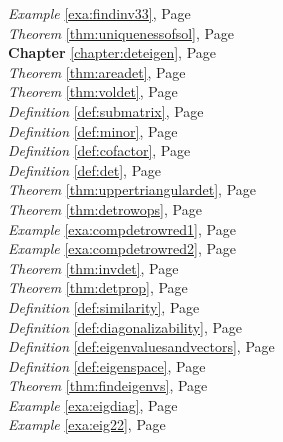 \begin{multicols}{3}
\begin{center}
      \textit{Example} \ref{exa:findinv33}, Page \pageref{exa:findinv33} \\
      \textit{Theorem} \ref{thm:uniquenessofsol}, Page \pageref{thm:uniquenessofsol} \\
      \textbf{Chapter} \ref{chapter:deteigen}, Page \pageref{chapter:deteigen} \\
      \textit{Theorem} \ref{thm:areadet}, Page \pageref{thm:areadet} \\
      \textit{Theorem} \ref{thm:voldet}, Page \pageref{thm:voldet} \\
      \textit{Definition} \ref{def:submatrix}, Page \pageref{def:submatrix} \\
      \textit{Definition} \ref{def:minor}, Page \pageref{def:minor} \\
      \textit{Definition} \ref{def:cofactor}, Page \pageref{def:cofactor} \\
      \textit{Definition} \ref{def:det}, Page \pageref{def:det} \\
      \textit{Theorem} \ref{thm:uppertriangulardet}, Page \pageref{thm:uppertriangulardet} \\
      \textit{Theorem} \ref{thm:detrowops}, Page \pageref{thm:detrowops} \\
      \textit{Example} \ref{exa:compdetrowred1}, Page \pageref{exa:compdetrowred1} \\
      \textit{Example} \ref{exa:compdetrowred2}, Page \pageref{exa:compdetrowred2} \\
      \textit{Theorem} \ref{thm:invdet}, Page \pageref{thm:invdet} \\
      \textit{Theorem} \ref{thm:detprop}, Page \pageref{thm:detprop} \\
      \textit{Definition} \ref{def:similarity}, Page \pageref{def:similarity} \\
      \textit{Definition} \ref{def:diagonalizability}, Page \pageref{def:diagonalizability} \\
      \textit{Definition} \ref{def:eigenvaluesandvectors}, Page \pageref{def:eigenvaluesandvectors} \\
      \textit{Definition} \ref{def:eigenspace}, Page \pageref{def:eigenspace} \\
      \textit{Theorem} \ref{thm:findeigenvs}, Page \pageref{thm:findeigenvs} \\
      \textit{Example} \ref{exa:eigdiag}, Page \pageref{exa:eigdiag} \\
      \textit{Example} \ref{exa:eig22}, Page \pageref{exa:eig22} \\

\end{center}
\end{multicols}
